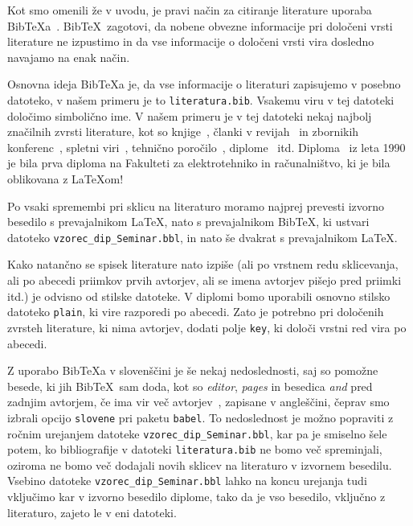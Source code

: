 \documentclass[a4paper, 12pt]{book}
\newcommand{\BibTeX}{{\sc Bib}\TeX}
\begin{document}
{{Kot smo omenili že v uvodu, je pravi način za citiranje literature uporaba \BibTeX{}a~\cite{bib}. 
\BibTeX\ zagotovi, da nobene obvezne informacije pri določeni vrsti literature ne izpustimo in da vse informacije o določeni vrsti vira dosledno navajamo na enak način.

Osnovna ideja \BibTeX{a} je, da vse informacije o literaturi zapisujemo v posebno datoteko, v našem primeru je to \texttt{literatura.bib}.
Vsakemu viru v tej datoteki določimo simbolično ime.
V  našem primeru je v tej datoteki nekaj najbolj značilnih zvrsti literature, kot so knjige~\cite{lamport}, 
članki v revijah~\cite{leonardo} in zbornikih konferenc~\cite{poglavje_springer}, 
spletni viri~\cite{bib,slovarcek,video}, 
tehnično poročilo~\cite{andersen2012kinect}, 
diplome~\cite{diploma} itd.
Diploma~\cite{diploma} iz leta 1990 je bila prva diploma na Fakulteti za elektrotehniko in računalništvo, ki je bila oblikovana z \LaTeX om!

Po vsaki spremembi pri sklicu na literaturo moramo najprej prevesti izvorno besedilo s prevajalnikom \LaTeX, nato s prevajalnikom  \BibTeX, ki ustvari datoteko  {\tt vzorec\_dip\_Seminar.bbl}, in nato še dvakrat s prevajalnikom  \LaTeX.

Kako natančno se spisek literature nato izpiše (ali po vrstnem redu sklicevanja, ali po abecedi priimkov prvih avtorjev, ali se imena avtorjev pišejo pred priimki itd.) je odvisno od stilske datoteke.
V diplomi bomo uporabili osnovno stilsko datoteko \texttt{plain}, ki vire razporedi po abecedi.
Zato je potrebno pri določenih zvrsteh literature, ki nima avtorjev, dodati polje \texttt{key}, ki določi vrstni red vira po abecedi.

Z uporabo \BibTeX{a} v slovenščini je še nekaj nedoslednosti, saj so pomožne besede, ki jih \BibTeX\ sam doda,  kot so \textit{editor},  \textit{pages} in besedica  \textit{and} pred zadnjim avtorjem, 
če ima vir več avtorjev~\cite{andersen2012kinect}, zapisane v angleščini,
čeprav smo izbrali opcijo \texttt{slovene} pri paketu \texttt{babel}.
To nedoslednost je možno popraviti z ročnim urejanjem datoteke {\tt vzorec\_dip\_Seminar.bbl}, 
kar pa je smiselno šele potem, ko bibliografije v datoteki \texttt{literatura.bib} ne bomo več spreminjali,
oziroma ne bomo več dodajali novih sklicev na literaturo v izvornem besedilu.
Vsebino datoteke {\tt vzorec\_dip\_Seminar.bbl} lahko na koncu urejanja tudi vključimo kar v izvorno besedilo diplome, tako da je vso besedilo, vključno z literaturo, zajeto le v eni datoteki.

}}
\end{document}
